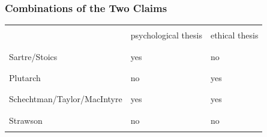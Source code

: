 \documentclass[xcolor=dvipsnames]{beamer}
\begin{document}
\begin{frame}
  \frametitle{Combinations of the Two Claims}
  \begin{tabular}{|l|l|l|}\hline
    \hspace{.5in}               & \hspace{.5in}        & \hspace{.5in}  \\
                                & psychological thesis & ethical thesis \\
    \hspace{.5in}               & \hspace{.5in}        & \hspace{.5in}  \\ \hline
    \hspace{.5in}               & \hspace{.5in}        & \hspace{.5in} \\
    Sartre/Stoics               & yes                  & no             \\
    \hspace{.5in}               & \hspace{.5in}        & \hspace{.5in}  \\ \hline
    \hspace{.5in}               & \hspace{.5in}        & \hspace{.5in} \\
    Plutarch                    & no                   & yes            \\ 
    \hspace{.5in}               & \hspace{.5in}        & \hspace{.5in}  \\ \hline
    \hspace{.5in}               & \hspace{.5in}        & \hspace{.5in} \\
    Schechtman/Taylor/MacIntyre & yes                  & yes            \\ 
    \hspace{.5in}               & \hspace{.5in}        & \hspace{.5in}  \\ \hline
    \hspace{.5in}               & \hspace{.5in}        & \hspace{.5in} \\
    Strawson                    & no                   & no             \\ 
    \hspace{.5in}               & \hspace{.5in}        & \hspace{.5in}  \\ \hline
  \end{tabular}
\end{frame}
\end{document}

